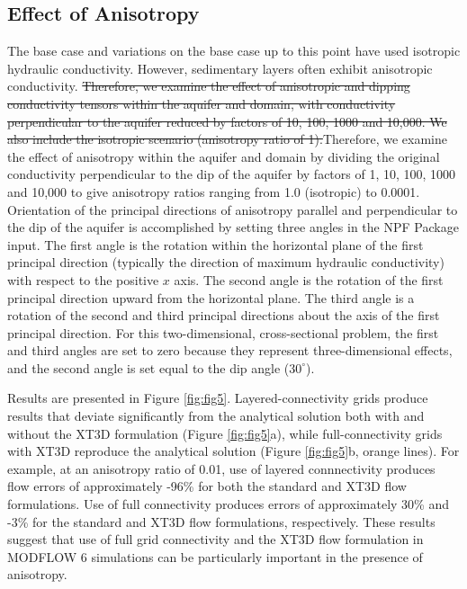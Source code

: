 \documentclass{article}
\begin{document}
\subsection*{Effect of Anisotropy}

The base case and variations {\color{red} on the base case} up to this point have used isotropic hydraulic conductivity. However, sedimentary layers often exhibit anisotropic conductivity. {\color{red} \sout{Therefore, we examine the effect of anisotropic and dipping conductivity tensors within the aquifer and domain, with conductivity perpendicular to the aquifer reduced by factors of 10, 100, 1000 and 10,000. We also include the isotropic scenario (anisotropy ratio of 1).}Therefore, we examine the effect of anisotropy within the aquifer and domain by dividing the original conductivity perpendicular to the dip of the aquifer by factors of 1, 10, 100, 1000 and 10,000 to give anisotropy ratios ranging from 1.0 (isotropic) to 0.0001.} {\color{red} Orientation of the principal directions of anisotropy parallel and perpendicular to the dip of the aquifer is accomplished by setting three angles in the NPF Package input. The first angle is the rotation within the horizontal plane of the first principal direction (typically the direction of maximum hydraulic conductivity) with respect to the positive $x$ axis. The second angle is the rotation of the first principal direction upward from the horizontal plane. The third angle is a rotation of the second and third principal directions about the axis of the first principal direction. For this two-dimensional, cross-sectional problem, the first and third angles are set to zero because they represent three-dimensional effects, and the second angle is set equal to the dip angle ($30^{\circ}$).}

Results are presented in Figure \ref{fig:fig5}. Layered-connectivity grids produce results that deviate significantly from the analytical solution both with and without the XT3D formulation (Figure \ref{fig:fig5}a), while full-connectivity grids with XT3D reproduce the analytical solution (Figure \ref{fig:fig5}b, orange lines). {\color{red} For example, at an anisotropy ratio of 0.01, use of layered connnectivity produces flow errors of approximately -96\% for both the standard and XT3D flow formulations. Use of full connectivity produces errors of approximately 30\% and -3\% for the standard and XT3D flow formulations, respectively.} {\color{red} These results suggest that use of full grid connectivity and the XT3D flow formulation in MODFLOW 6 simulations can be particularly important in the presence of anisotropy.}
\end{document}
